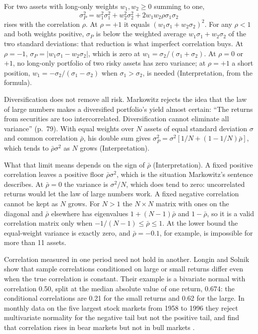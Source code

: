 \begin{qfmechanism}\label{mech:diversification-correlation}
 For two assets with long-only weights $w_1,w_2\ge0$ summing to one,
\[ \sigma_P^2=w_1^2\sigma_1^2+w_2^2\sigma_2^2+2w_1w_2\rho\sigma_1\sigma_2 \]
\citep[pp.~80--81]{s6-markowitz} rises with the correlation $\rho$. At $\rho=+1$ it equals $(w_1\sigma_1+w_2\sigma_2)^2$. For any $\rho<1$ and both weights positive, $\sigma_P$ is below the weighted average $w_1\sigma_1+w_2\sigma_2$ of the two standard deviations: that reduction is what imperfect correlation buys. At $\rho=-1$, $\sigma_P=|w_1\sigma_1-w_2\sigma_2|$, which is zero at $w_1=\sigma_2/(\sigma_1+\sigma_2)$. At $\rho=0$ or $+1$, no long-only portfolio of two risky assets has zero variance; at $\rho=+1$ a short position, $w_1=-\sigma_2/(\sigma_1-\sigma_2)$ when $\sigma_1>\sigma_2$, is needed (Interpretation, from the formula).

Diversification does not remove all risk. Markowitz rejects the idea that the law of large numbers makes a diversified portfolio's yield almost certain: ``The returns from securities are too intercorrelated. Diversification cannot eliminate all variance'' (p.~79). With equal weights over $N$ assets of equal standard deviation $\sigma$ and common correlation $\bar\rho$, his double sum gives $\sigma_P^2=\sigma^2[1/N+(1-1/N)\bar\rho]$, which tends to $\bar\rho\sigma^2$ as $N$ grows (Interpretation).

What that limit means depends on the sign of $\bar\rho$ (Interpretation). A fixed positive correlation leaves a positive floor $\bar\rho\sigma^2$, which is the situation Markowitz's sentence describes. At $\bar\rho=0$ the variance is $\sigma^2/N$, which does tend to zero: uncorrelated returns would let the law of large numbers work. A fixed negative correlation cannot be kept as $N$ grows. For $N>1$ the $N\times N$ matrix with ones on the diagonal and $\bar\rho$ elsewhere has eigenvalues $1+(N-1)\bar\rho$ and $1-\bar\rho$, so it is a valid correlation matrix only when $-1/(N-1)\le\bar\rho\le1$. At the lower bound the equal-weight variance is exactly zero, and $\bar\rho=-0.1$, for example, is impossible for more than 11 assets.

Correlation measured in one period need not hold in another. Longin and Solnik show that sample correlations conditioned on large or small returns differ even when the true correlation is constant. Their example is a bivariate normal with correlation 0.50, split at the median absolute value of one return, 0.674: the conditional correlations are 0.21 for the small returns and 0.62 for the large. In monthly data on the five largest stock markets from 1958 to 1996 they reject multivariate normality for the negative tail but not the positive tail, and find that correlation rises in bear markets but not in bull markets \citep[working-paper version of April~2000, abstract and pp.~1--2]{w2-longin-solnik}.


\end{qfmechanism}
